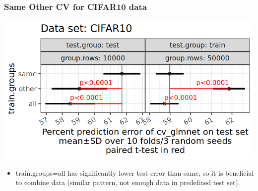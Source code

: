 \documentclass{beamer}
\begin{document}
\begin{frame}
  \frametitle{Same Other CV for CIFAR10 data}
  \includegraphics[width=\textwidth]{CIFAR10_error_glmnet_sizes_mean_SD_pvalue.png}
  \begin{itemize}
  \item train.groups=all has significantly
    lower test error than same, so it is beneficial to combine data
    (similar pattern, not enough data in predefined test set).
  \end{itemize}
\end{frame}
\end{document}
